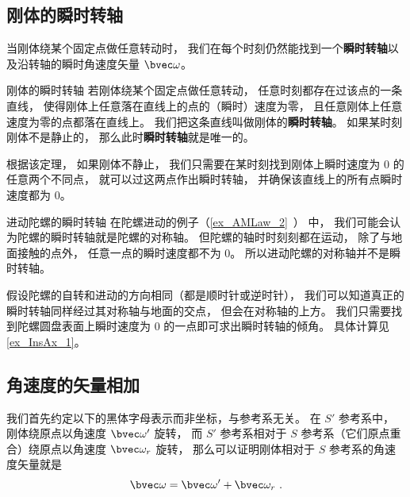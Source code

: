 


\subsection{刚体的瞬时转轴}
当刚体绕某个固定点做任意转动时， 我们在每个时刻仍然能找到一个\textbf{瞬时转轴}以及沿转轴的瞬时角速度矢量 $\bvec \omega$。

\begin{theorem}{刚体的瞬时转轴}
若刚体绕某个固定点做任意转动， 任意时刻都存在过该点的一条直线， 使得刚体上任意落在直线上的点的（瞬时）速度为零， 且任意刚体上任意速度为零的点都落在直线上。 我们把这条直线叫做刚体的\textbf{瞬时转轴}。 如果某时刻刚体不是静止的， 那么此时\textbf{瞬时转轴}就是唯一的。
\end{theorem}
根据该定理， 如果刚体不静止， 我们只需要在某时刻找到刚体上瞬时速度为 0 的任意两个不同点， 就可以过这两点作出瞬时转轴， 并确保该直线上的所有点瞬时速度都为 0。

\begin{example}{进动陀螺的瞬时转轴}\label{ex_InsAx_2}
在陀螺进动的例子（\autoref{ex_AMLaw_2}~） 中， 我们可能会认为陀螺的瞬时转轴就是陀螺的对称轴。 但陀螺的轴时时刻刻都在运动， 除了与地面接触的点外， 任意一点的瞬时速度都不为 0。 所以进动陀螺的对称轴并不是瞬时转轴。

假设陀螺的自转和进动的方向相同（都是顺时针或逆时针）， 我们可以知道真正的瞬时转轴同样经过其对称轴与地面的交点， 但会在对称轴的上方。 我们只需要找到陀螺圆盘表面上瞬时速度为 0 的一点即可求出瞬时转轴的倾角。 具体计算见\autoref{ex_InsAx_1}。
\end{example}

\subsection{角速度的矢量相加}

我们首先约定以下的黑体字母表示而非坐标，与参考系无关。 在 $S'$ 参考系中， 刚体绕原点以角速度 $\bvec \omega'$ 旋转， 而 $S'$ 参考系相对于 $S$ 参考系（它们原点重合）绕原点以角速度 $\bvec \omega_r$ 旋转， 那么可以证明刚体相对于 $S$ 参考系的角速度矢量就是
\begin{equation}\label{eq_InsAx_1}
\bvec \omega = \bvec \omega' + \bvec \omega_r~.
\end{equation}



